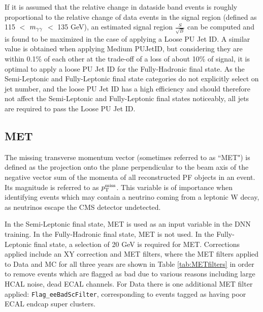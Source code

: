 If it is assumed that the relative change in dataside band events is roughly proportional to the relative change of data events in the signal region (defined as 115 $<$ $m_{\gamma\gamma}$ $<$ 135 GeV), an estimated signal region $\frac{S}{\sqrt{B}}$
can be computed and is found to be maximized in the case of applying a Loose PU Jet ID. A similar value is obtained when applying Medium PUJetID, but considering they are within
0.1\% of each other at the trade-off of a loss of about 10\% of signal, it is optimal to apply a loose PU Jet ID for the Fully-Hadronic final state. As the Semi-Leptonic and Fully-Leptonic
final state categories do not explicitly select on jet number, and the loose PU Jet ID has a high efficiency and should therefore not affect the Semi-Leptonic and Fully-Leptonic
final states noticeably, all jets are required to pass the Loose PU Jet ID.

\subsection{MET} \label{sec:MET}

The missing transverse momentum vector \ptvecmiss (sometimes referred to as ``MET") is defined as the projection onto the plane perpendicular to the beam axis of the negative vector sum of the momenta of all reconstructed PF objects in an event. Its magnitude is referred to as \ensuremath{\pt^\text{miss}}\xspace. This variable is of importance when identifying events which may contain a neutrino coming from a leptonic W decay, as neutrinos escape the CMS detector undetected.

In the Semi-Leptonic final state, MET is used as an input variable in the DNN training. In the Fully-Hadronic final state, MET is not used. In the Fully-Leptonic final state, a selection of 20 GeV is required for MET.
Corrections applied include an XY correction and MET filters, where the MET filters applied to Data and MC for all three years are shown in Table \ref{tab:METfilters} in order to remove events which are flagged as bad due to various reasons including large HCAL noise, dead ECAL channels. For Data there is one additional MET filter applied: {\tt Flag\_eeBadScFilter}, corresponding to events tagged as having poor ECAL endcap super clusters. 

